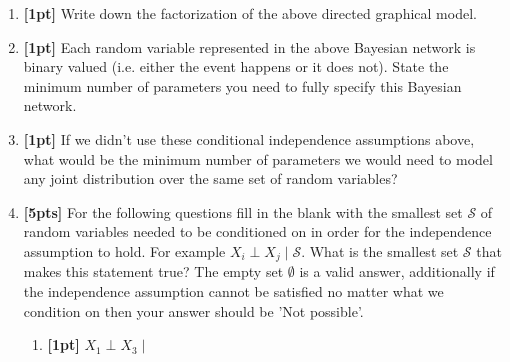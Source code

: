 \documentclass[12pt]{article}
\begin{document}
\begin{enumerate}
\item \textbf{[1pt]} Write down the factorization of the above directed graphical model.

\begin{tcolorbox}[fit,height=1cm, width=15cm, blank, borderline={1pt}{-2pt},nobeforeafter]
\end{tcolorbox}


\item \textbf{[1pt]} Each random variable represented in the above Bayesian network is binary valued (i.e. either the event happens or it does not). State the minimum number of parameters you need to fully specify  this Bayesian network.

\begin{tcolorbox}[fit,height=1cm, width=2cm, blank, borderline={1pt}{-2pt},nobeforeafter]
\end{tcolorbox}


\item \textbf{[1pt]} If we didn't use these conditional independence assumptions above, what would be the minimum number of parameters we would need to model any joint distribution over the same set of random variables?

\begin{tcolorbox}[fit,height=1cm, width=2cm, blank, borderline={1pt}{-2pt},nobeforeafter]
\end{tcolorbox}



\item \textbf{[5pts]} For the following questions fill in the blank with the smallest set $\mathcal{S}$ of random variables needed to be conditioned on in order for the independence assumption to hold. For example $X_i \perp X_j \mid \mathcal{S}$. What is the smallest set $\mathcal{S}$ that makes this statement true? The empty set $\emptyset$ is a valid answer, additionally if the independence assumption cannot be satisfied no matter what we condition on then your answer should be 'Not possible'.
\begin{enumerate}

\item \textbf{[1pt]} $X_1 \perp X_3 \mid $ \begin{tcolorbox}[fit,height=1cm, width=2cm, blank, borderline={1pt}{-2pt},nobeforeafter]
\end{tcolorbox}  \\


\end{enumerate}
\end{enumerate}
\end{document}
